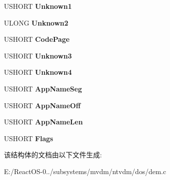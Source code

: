 \begin{DoxyCompactItemize}
U\+S\+H\+O\+RT {\bfseries Unknown1}
\item 
\mbox{\label{struct___n_e_x_t___c_m_d_a8a812eaf7f7664338ae060e1fad8e246}} 
U\+L\+O\+NG {\bfseries Unknown2}
\item 
\mbox{\label{struct___n_e_x_t___c_m_d_a6306ca59f25f05e3a2deb0bdfaa62ee7}} 
U\+S\+H\+O\+RT {\bfseries Code\+Page}
\item 
\mbox{\label{struct___n_e_x_t___c_m_d_a303c9f297e4cdc23fa12c0aba6454217}} 
U\+S\+H\+O\+RT {\bfseries Unknown3}
\item 
\mbox{\label{struct___n_e_x_t___c_m_d_ab1b280512cd06ab49fe2e14e102c1aa6}} 
U\+S\+H\+O\+RT {\bfseries Unknown4}
\item 
\mbox{\label{struct___n_e_x_t___c_m_d_a3f6781bd149e194a8fa3a0f091720174}} 
U\+S\+H\+O\+RT {\bfseries App\+Name\+Seg}
\item 
\mbox{\label{struct___n_e_x_t___c_m_d_a5517badd5c84c198577138b367e79331}} 
U\+S\+H\+O\+RT {\bfseries App\+Name\+Off}
\item 
\mbox{\label{struct___n_e_x_t___c_m_d_a771146072e3f9f901d77dc521af3c226}} 
U\+S\+H\+O\+RT {\bfseries App\+Name\+Len}
\item 
\mbox{\label{struct___n_e_x_t___c_m_d_ab60adcc4b93152ce35a74c88cdcdf0cc}} 
U\+S\+H\+O\+RT {\bfseries Flags}
\end{DoxyCompactItemize}


该结构体的文档由以下文件生成\+:\begin{DoxyCompactItemize}
\item 
E\+:/\+React\+O\+S-\/0../subsystems/mvdm/ntvdm/dos/dem.\+c\end{DoxyCompactItemize}
